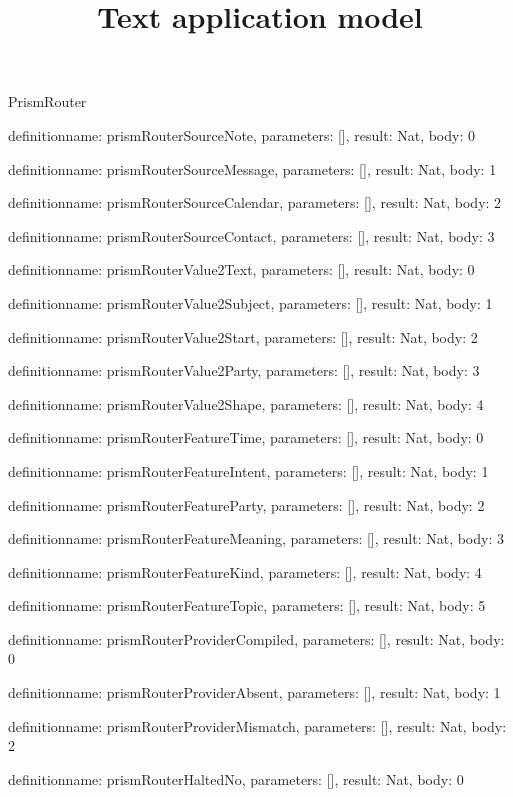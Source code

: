 \begin{lexlean}{PrismRouter}
\title{Text application model}
\begin{semanticmodule}
definition{name: prismRouterSourceNote, parameters: [], result: Nat, body: 0}

definition{name: prismRouterSourceMessage, parameters: [], result: Nat, body: 1}

definition{name: prismRouterSourceCalendar, parameters: [], result: Nat, body: 2}

definition{name: prismRouterSourceContact, parameters: [], result: Nat, body: 3}

definition{name: prismRouterValue2Text, parameters: [], result: Nat, body: 0}

definition{name: prismRouterValue2Subject, parameters: [], result: Nat, body: 1}

definition{name: prismRouterValue2Start, parameters: [], result: Nat, body: 2}

definition{name: prismRouterValue2Party, parameters: [], result: Nat, body: 3}

definition{name: prismRouterValue2Shape, parameters: [], result: Nat, body: 4}

definition{name: prismRouterFeatureTime, parameters: [], result: Nat, body: 0}

definition{name: prismRouterFeatureIntent, parameters: [], result: Nat, body: 1}

definition{name: prismRouterFeatureParty, parameters: [], result: Nat, body: 2}

definition{name: prismRouterFeatureMeaning, parameters: [], result: Nat, body: 3}

definition{name: prismRouterFeatureKind, parameters: [], result: Nat, body: 4}

definition{name: prismRouterFeatureTopic, parameters: [], result: Nat, body: 5}

definition{name: prismRouterProviderCompiled, parameters: [], result: Nat, body: 0}

definition{name: prismRouterProviderAbsent, parameters: [], result: Nat, body: 1}

definition{name: prismRouterProviderMismatch, parameters: [], result: Nat, body: 2}

definition{name: prismRouterHaltedNo, parameters: [], result: Nat, body: 0}


\end{semanticmodule}
\end{lexlean}
